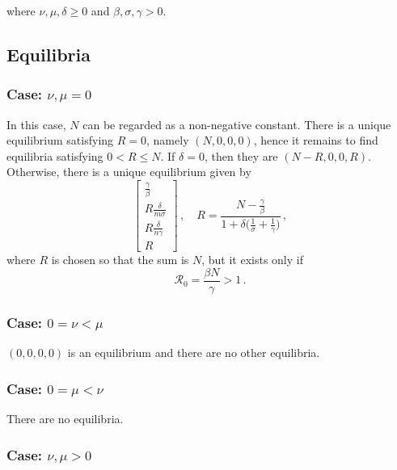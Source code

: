\documentclass[fleqn]{article}
\begin{document}
where $\nu,\mu,\delta \geq 0$ and $\beta,\sigma,\gamma > 0$.

\subsection{Equilibria}

\subsubsection{Case: $\nu, \mu = 0$}

In this case, $N$ can be regarded as a non-negative constant.  There is
a unique equilibrium satisfying $R = 0$, namely $(N, 0, 0, 0)$, hence it
remains to find equilibria satisfying $0 < R \leq N$.  If $\delta = 0$,
then they are $(N - R, 0, 0, R)$.  Otherwise, there is a unique
equilibrium given by
\begin{equation}
\begin{bmatrix}
  \frac{\gamma}{\beta} \\
  R \frac{\delta}{m \sigma} \\
  R \frac{\delta}{n \gamma} \\
  R
\end{bmatrix}
\,,\quad
R = \frac{N - \frac{\gamma}{\beta}}{1 + \delta \big(\frac{1}{\sigma} + \frac{1}{\gamma}\big)}\,,
\end{equation}
where $R$ is chosen so that the sum is $N$, but it exists only if
\begin{equation}
\mathcal{R}_{0} = \frac{\beta N}{\gamma} > 1\,.
\end{equation}

\subsubsection{Case: $0 = \nu < \mu$}

$(0, 0, 0, 0)$ is an equilibrium and there are no other equilibria.

\subsubsection{Case: $0 = \mu < \nu$}

There are no equilibria.

\subsubsection{Case: $\nu, \mu > 0$}
\end{document}
